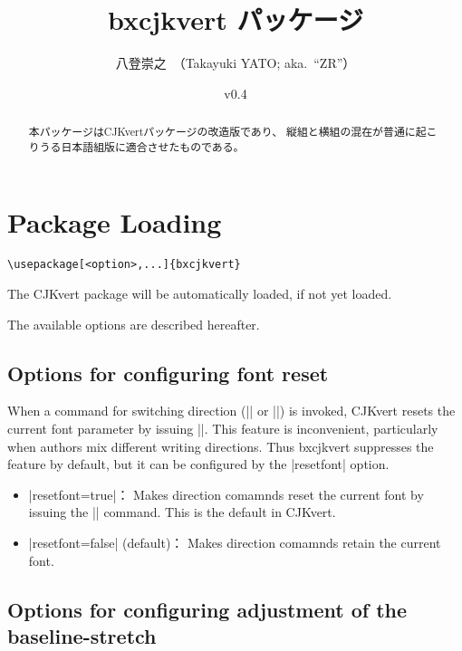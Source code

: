 \documentclass[a4paper]{ltjsarticle}
\newcommand{\PkgVersion}{0.4}
\newcommand{\PkgDate}{2016/11/11}
\newcommand{\Pkg}[1]{\textsf{#1}}
\newcommand{\Means}{：\quad}
\begin{document}
\title{\Pkg{bxcjkvert} パッケージ}
\author{八登崇之\ （Takayuki YATO; aka.~``ZR''）}
\date{v\PkgVersion\quad[\PkgDate]}
\maketitle

\begin{abstract}
本パッケージは\Pkg{CJKvert}パッケージの改造版であり、
縦組と横組の混在が普通に起こりうる日本語組版に適合させたものである。
\end{abstract}

\tableofcontents

\section{Package Loading}
\label{sec:loading}

\begin{verbatim}
\usepackage[<option>,...]{bxcjkvert}
\end{verbatim}

The \Pkg{CJKvert} package will be automatically loaded,
if not yet loaded.

The available options are described hereafter.

\subsection{Options for configuring font reset}

When a command for switching direction (|\CJKhorz| or |\CJKvert|)
is invoked, \Pkg{CJKvert} resets the current font parameter
by issuing |\normalfont|.
This feature is inconvenient, particularly
when authors mix different writing directions.
Thus \Pkg{bxcjkvert} suppresses the feature by default,
but it can be configured by the |resetfont| option.

\begin{itemize}
\item |resetfont=true|\Means
  Makes direction comamnds reset the current font by issuing
  the |\normalfont| command.
  This is the default in \Pkg{CJKvert}.
\item |resetfont=false| (default)\Means
  Makes direction comamnds retain the current font.
\end{itemize}

\subsection{Options for configuring adjustment of the baseline-stretch}
\end{document}
